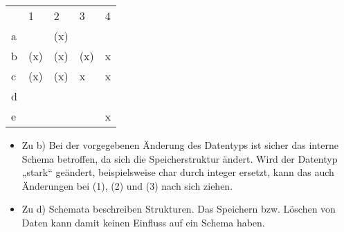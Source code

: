 \documentclass{bschlangaul-aufgabe}
\begin{document}
\begin{bAntwort}
\begin{tabular}{lllll}
  &  1  &  2  & 3   & 4 \\
a &     & (x) &     &   \\
b & (x) & (x) & (x) & x \\
c & (x) & (x) &  x  & x \\
d &     &     &     &   \\
e &     &     &     & x
\end{tabular}


\begin{itemize}
\item Zu b) Bei der vorgegebenen Änderung des Datentyps ist sicher das
interne Schema betroffen, da sich die Speicherstruktur ändert. Wird der
Datentyp „stark“ geändert, \dh beispielsweise char durch integer
ersetzt, kann das auch Änderungen bei (1), (2) und (3) nach sich ziehen.

\item Zu d) Schemata beschreiben Strukturen. Das Speichern bzw. Löschen
von Daten kann damit keinen Einfluss auf ein Schema haben.
\end{itemize}

\end{bAntwort}
\end{document}
